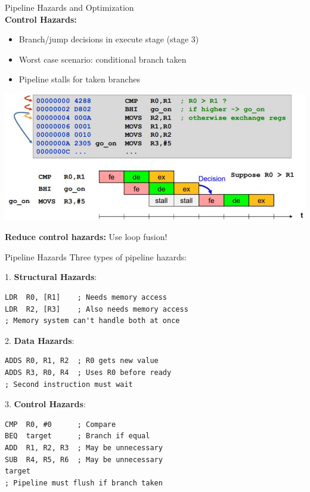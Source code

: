 \columnbreak

\begin{concept}{Pipeline Hazards and Optimization}\\
\textbf{Control Hazards:}
\begin{itemize}
  \item Branch/jump decisions in execute stage (stage 3)
  \item Worst case scenario: conditional branch taken
  \item Pipeline stalls for taken branches
\end{itemize}

\includegraphics[width=\linewidth]{images/2024_12_29_79e6b22f503fb7b4f718g-15}

\textbf{Reduce control hazards:} Use loop fusion!
\end{concept}

\begin{example2}{Pipeline Hazards}
Three types of pipeline hazards:

1. \textbf{Structural Hazards}:
\begin{lstlisting}[style=basesmol]
LDR  R0, [R1]    ; Needs memory access
LDR  R2, [R3]    ; Also needs memory access
; Memory system can't handle both at once
\end{lstlisting}

2. \textbf{Data Hazards}:
\begin{lstlisting}[style=basesmol]
ADDS R0, R1, R2  ; R0 gets new value
ADDS R3, R0, R4  ; Uses R0 before ready
; Second instruction must wait
\end{lstlisting}

3. \textbf{Control Hazards}:
\begin{lstlisting}[style=basesmol]
CMP  R0, #0      ; Compare
BEQ  target      ; Branch if equal
ADD  R1, R2, R3  ; May be unnecessary
SUB  R4, R5, R6  ; May be unnecessary
target
; Pipeline must flush if branch taken
\end{lstlisting}
\end{example2}

